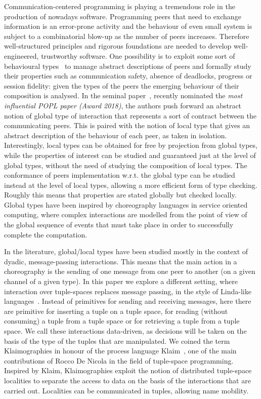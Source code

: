 
Communication-centered programming is playing a tremendous role in the production of nowadays software. Programming peers that need to exchange information is an error-prone activity and the behaviour of even small system is subject to a combinatorial blow-up as the number of peers increases.
Therefore well-structured principles and rigorous foundations are needed to develop well-engineered, trustworthy software. 
One possibility is to exploit some sort of behavioural types~\cite{} to manage abstract descriptions of peers and formally study their properties such as communication safety, absence of deadlocks, progress or session fidelity: given the types of the peers the emerging behaviour of their composition is analysed.
In the seminal paper~\cite{DBLP:conf/popl/HondaYC08}, recently nominated the \emph{most influential POPL paper (Award 2018)}, the authors push forward an abstract notion of global type of interaction that represents a sort of contract between the communicating peers. This is paired with the notion of local type that gives an abstract description of the behaviour of each peer, as taken in isolation.
Interestingly, local types can be obtained for free by projection from global types, while the properties of interest can be studied and guaranteed just at the level of global types, without the need of studying the composition of local types. The conformance of peers implementation w.r.t. the global type can be studied instead at the level of local types, allowing a more efficient form of type checking. Roughly this means that properties are stated globally but checked locally. Global types have been inspired by choreography languages in service oriented computing, where complex interactions are modelled from the point of view of the global sequence of events that must take place in order to successfully complete the computation.

In the literature, global/local types have been studied mostly in the context of dyadic, message-passing interactions. This means that the main action in a choreography is the sending of one message from one peer to another (on a given channel of a given type). In this paper we explore a different setting, where interaction over tuple-spaces replaces message passing, in the style of Linda-like languages~\cite{DBLP:journals/toplas/Gelernter85}.
Instead of primitives for sending and receiving messages, here there are primitive for inserting a tuple on a tuple space, for reading (without consuming) a tuple from a tuple space or for retrieving a tuple from a tuple space. We call these interactions data-driven, as decisions will be taken on the basis of the type of the tuples that are manipulated. We coined the term Klaimographies in honour of the process language Klaim~\cite{DBLP:journals/tse/NicolaFP98}, one of the main contributions of Rocco De Nicola in the field of tuple-space programming. Inspired by Klaim, Klaimographies exploit the notion of distributed tuple-space localities to separate the access to data on the basis of the interactions that are carried out. Localities can be communicated in tuples, allowing name mobility.

